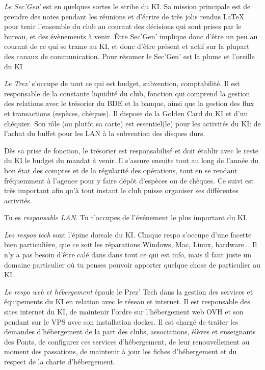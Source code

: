 \documentclass{ki019}
\begin{document}

\emph{Le Sec’Gen’} est en quelques sortes le scribe du KI. Sa mission principale est de prendre des notes pendant les réunions et d’écrire de très jolis rendus LaTeX pour tenir l’ensemble du club au courant des décisions qui sont prises par le bureau, et des évènements à venir. Être Sec’Gen’ implique donc d’être un peu au courant de ce qui se trame au KI, et donc d’être présent et actif sur la plupart des canaux de communication. Pour résumer le Sec’Gen’ est la plume et l’oreille du KI


\emph{Le Trez’} s’occupe de tout ce qui est budget, subvention, comptabilité. Il est responsable de la constante liquidité du club, fonction qui comprend la gestion des relations avec le trésorier du BDE et la banque, ainsi que la gestion des flux et transactions (espèces, chèques). Il dispose de la Golden Card du KI et d’un chéquier. Son rôle (ou plutôt sa carte) est essentiel(le) pour les activités du KI: de l’achat du buffet pour les LAN à la subvention des disques durs.

Dès sa prise de fonction, le trésorier est responsabilisé et doit établir avec le reste du KI le budget du mandat à venir. Il s’assure ensuite tout au long de l’année du bon état des comptes et de la régularité des opérations, tout en se rendant fréquemment à l’agence pour y faire dépôt d’espèces ou de chèques. Ce suivi est très important afin qu’à tout instant le club puisse organiser ses différentes activités.



Tu es \emph{responsable LAN}. Tu t’occupes de l’événement le plus important du KI.


\emph{Les respos tech} sont l’épine dorsale du KI. Chaque respo s’occupe d’une facette bien particulière, que ce soit les réparations Windows, Mac, Linux, hardware... Il n’y a pas besoin d’être calé dans dans tout ce qui est info, mais il faut juste un domaine particulier où tu penses pouvoir apporter quelque chose de particulier au KI.


\emph{Le respo web et hébergement} épaule le Prez’ Tech dans la gestion des services et équipements du KI en relation avec le réseau et internet. Il est responsable des sites internet du KI, de maintenir l’ordre sur l’hébergement web OVH et son pendant sur le VPS avec son installation docker. Il est chargé de traiter les demandes d’hébergement de la part des clubs, associations, élèves et enseignants des Ponts, de configurer ces services d’hébergement, de leur renouvellement au moment des passations, de maintenir à jour les fiches d’hébergement et du
respect de la charte d’hébergement.
\end{document}
